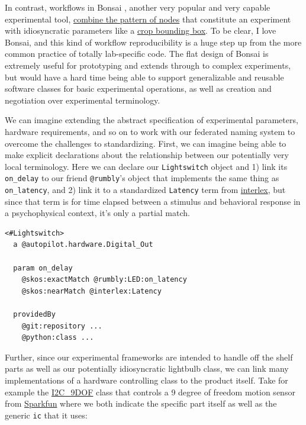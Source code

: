 \documentclass[10pt]{tufte-book}
\begin{document}
In contrast, workflows in Bonsai \citep{lopesBonsaiEventbasedFramework2015a, lopesNewOpenSourceTools2021} ,
another very popular and very capable experimental tool,
\href{https://github.com/bonsai-rx/bonsai-examples/blob/cbc2c1decc11e1dc1df920421ef88a16fd2e184c/RoiTrigger/RoiTrigger.bonsai}{combine
the pattern of nodes} that constitute an experiment with idiosyncratic
parameters like a
\href{https://github.com/bonsai-rx/bonsai-examples/blob/cbc2c1decc11e1dc1df920421ef88a16fd2e184c/RoiTrigger/RoiTrigger.bonsai\#L76-L85}{crop
bounding box}. To be clear, I love Bonsai, and this kind of workflow
reproducibility is a huge step up from the more common practice of
totally lab-specific code. The flat design of Bonsai is extremely useful
for prototyping and extends through to complex experiments, but would
have a hard time being able to support generalizable and reusable
software classes for basic experimental operations, as well as creation
and negotiation over experimental terminology.

We can imagine extending the abstract specification of experimental
parameters, hardware requirements, and so on to work with our federated
naming system to overcome the challenges to standardizing. First, we can
imagine being able to make explicit declarations about the relationship
between our potentially very local terminology. Here we can declare our
\texttt{Lightswitch} object and 1) link its \texttt{on\_delay} to our
friend \texttt{@rumbly}'s object that implements the same thing as
\texttt{on\_latency}, and 2) link it to a standardized \texttt{Latency}
term from
\href{https://scicrunch.org/scicrunch/interlex/view/ilx_0106040\#annotations}{interlex},
but since that term is for time elapsed between a stimulus and
behavioral response in a psychophysical context, it's only a partial
match.

\begin{verbatim}
<#Lightswitch>
  a @autopilot.hardware.Digital_Out

  param on_delay
    @skos:exactMatch @rumbly:LED:on_latency
    @skos:nearMatch @interlex:Latency

  providedBy
    @git:repository ...
    @python:class ...
\end{verbatim}

Further, since our experimental frameworks are intended to handle off
the shelf parts as well as our potentially idiosyncratic lightbulb
class, we can link many implementations of a hardware controlling class
to the product itself. Take for example the
\href{https://docs.auto-pi-lot.com/en/latest/hardware/i2c.html\#autopilot.hardware.i2c.I2C_9DOF}{I2C\_9DOF}
class that controls a 9 degree of freedom motion sensor from
\href{https://www.sparkfun.com/products/13944}{Sparkfun} where we both
indicate the specific part itself as well as the generic \texttt{ic}
that it uses:
\end{document}

